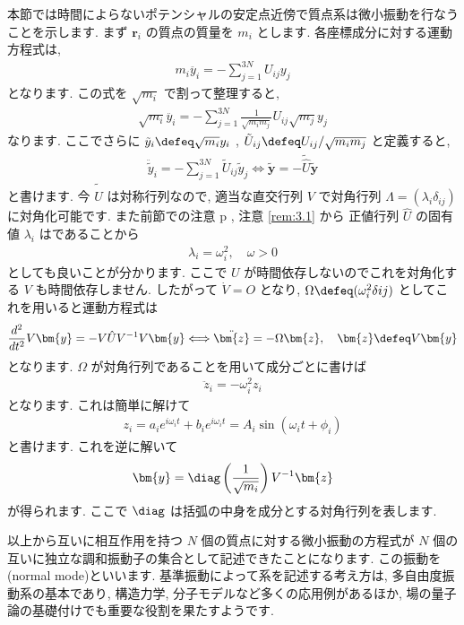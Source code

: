 \documentclass[openany, a4paper, oneside]{jsbook}
\begin{document}
本節では時間によらないポテンシャルの安定点近傍で質点系は微小振動を行なうことを示します.
まず $\bm{r}_i$ の質点の質量を $m_i$ とします.
各座標成分に対する運動方程式は,
\begin{align}
m_i \ddot{ y_i }
=
-\sum_{j=1}^{3N} U_{ij} y_j
\end{align}
となります. この式を $\sqrt{m_i}$ で割って整理すると,
\begin{align}
\sqrt{m_i} \ddot{ y_i }
=
-\sum_{j=1}^{3N} \frac{1} {\sqrt{m_i m_j}} U_{ij} \sqrt{m_j} y_j
\end{align}
なります. ここでさらに
$\tilde{y}_i \defeq \sqrt{m_i} y_i$ ,  $\tilde{U}_{ij} \defeq U_{ij}/\sqrt{ m_i m_j }$ と定義すると,
\begin{gather}
\ddot{ \tilde{y} }_i
=
-\sum_{j=1}^{3N} \tilde{ U }_{ij} \tilde{y}_j
\Longleftrightarrow
\tilde{ \bm{y} }
=
-\tilde{ \hat{U} } \tilde{ \bm{y} }
\end{gather}
と書けます.
今 $\tilde{ \hat{U} }$ は対称行列なので, 適当な直交行列 $V$ で対角行列 $\Lambda = ( \lambda_i \delta_{ij} )$ に対角化可能です.
また前節での注意 p \pageref{rem:3.1}, 注意 \ref{rem:3.1} から
正値行列 $\hat{U}$ の固有値 $\lambda_i$ はであることから
\begin{align}
\lambda _i
=
\omega _i ^2, \quad
\omega > 0
\end{align}
としても良いことが分かります.
ここで $U$ が時間依存しないのでこれを対角化する $V$ も時間依存しません.
したがって $\dot{V}=O$ となり,  $\Omega \defeq ( \omega_i^2 \delta{ij} )$ としてこれを用いると運動方程式は
\begin{gather}
\frac{d^2} {dt^2} V \bm{y}
=
-V \hat{U} V^{-1} V \bm{y}
\Longleftrightarrow
\ddot{ \bm{z} }
=
-\Omega \bm{z}, \quad
\bm{z} \defeq V \bm{y}
\end{gather}
となります.
$\Omega$ が対角行列であることを用いて成分ごとに書けば
\begin{align}
\ddot{z}_i
=
-\omega_i ^2 z_i
\end{align}
となります.
これは簡単に解けて
\begin{align}
z_i
=
a_i e^{ i \omega_i t} + b_i e^{ i \omega_i t }
=
A_i \sin ( \omega_i t + \phi_i )
\end{align}
と書けます. これを逆に解いて
\begin{align}
\bm{y}
=
\diag \left ( \frac{1} { \sqrt{m_i} } \right) V^{-1} \bm{z}
\end{align}
が得られます.
ここで $\diag$ は括弧の中身を成分とする対角行列を表します.

以上から互いに相互作用を持つ $N$ 個の質点に対する微小振動の方程式が
$N$ 個の互いに独立な調和振動子の集合として記述できたことになります.
この振動を(normal mode)といいます.
基準振動によって系を記述する考え方は, 多自由度振動系の基本であり,
構造力学, 分子モデルなど多くの応用例があるほか, 場の量子論の基礎付けでも重要な役割を果たすようです.
\end{document}
